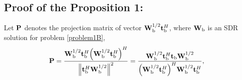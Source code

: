 \documentclass[10pt,journal,letterpaper,twocolumn,twoside]{IEEEtran} %
\begin{document}
  \begin{appendices}


\section{{Proof of the Proposition 1:}}



Let ${\bf{P}}$ denotes the projection matrix of vector ${{\bf{W}}_{\rm{b}}^{{1 \mathord{\left/
 {\vphantom {1 2}} \right.
 \kern-\nulldelimiterspace} 2}}{\bf{t}}_{\rm{b}}^H}$, where  ${\bf{W}}_{\rm{b}}$ is an SDR solution for problem \eqref{problem1B},
 \begin{align}
 {\bf{P}} = \frac{{{\bf{W}}_{\rm{b}}^{{1 \mathord{\left/
 {\vphantom {1 2}} \right.
 \kern-\nulldelimiterspace} 2}}{\bf{t}}_{\rm{b}}^H{{\left( {{\bf{W}}_{\rm{b}}^{{1 \mathord{\left/
 {\vphantom {1 2}} \right.
 \kern-\nulldelimiterspace} 2}}{\bf{t}}_{\rm{b}}^H} \right)}^H}}}{{{{\left\| {{\bf{t}}_{\rm{b}}^H{\bf{W}}_{\rm{b}}^{{1 \mathord{\left/
 {\vphantom {1 2}} \right.
 \kern-\nulldelimiterspace} 2}}} \right\|}^2}}} = \frac{{{\bf{W}}_{\rm{b}}^{{1 \mathord{\left/
 {\vphantom {1 2}} \right.
 \kern-\nulldelimiterspace} 2}}{\bf{t}}_{\rm{b}}^H{{\bf{t}}_{\rm{b}}}{\bf{W}}_{\rm{b}}^{{1 \mathord{\left/
 {\vphantom {1 2}} \right.
 \kern-\nulldelimiterspace} 2}}}}{{{{\left( {{\bf{W}}_{\rm{b}}^{{1 \mathord{\left/
 {\vphantom {1 2}} \right.
 \kern-\nulldelimiterspace} 2}}{\bf{t}}_{\rm{b}}^H} \right)}^H}{\bf{W}}_{\rm{b}}^{{1 \mathord{\left/
 {\vphantom {1 2}} \right.
 \kern-\nulldelimiterspace} 2}}{\bf{t}}_{\rm{b}}^H}},
 \end{align}


\end{appendices}
\end{document}
